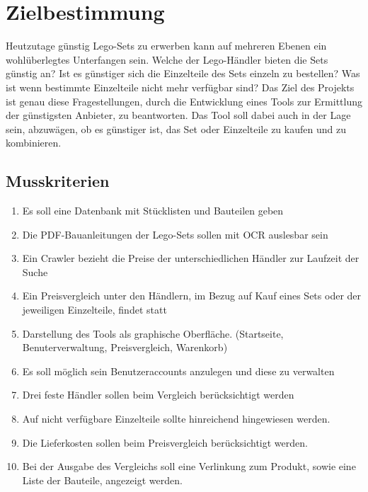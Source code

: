 \newpage

\tableofcontents

\newpage

\section{Zielbestimmung}

Heutzutage günstig Lego-Sets zu erwerben kann auf mehreren Ebenen ein wohlüberlegtes Unterfangen sein. Welche der Lego-Händler bieten die Sets günstig an? Ist es günstiger sich die Einzelteile des Sets einzeln zu bestellen? Was ist wenn bestimmte Einzelteile nicht mehr verfügbar sind? \newline
Das Ziel des Projekts ist genau diese Fragestellungen, durch die Entwicklung eines Tools zur Ermittlung der günstigsten Anbieter, zu beantworten. Das Tool soll dabei auch in der Lage sein, abzuwägen, ob es günstiger ist, das Set oder Einzelteile zu kaufen und zu kombinieren.

\subsection{Musskriterien}
\begin{enumerate}
\item Es soll eine Datenbank mit Stücklisten und Bauteilen geben
\item Die PDF-Bauanleitungen der Lego-Sets sollen mit OCR auslesbar sein
\item Ein Crawler bezieht die Preise der unterschiedlichen Händler zur Laufzeit der Suche
\item  Ein Preisvergleich unter den Händlern, im Bezug auf Kauf eines Sets oder der jeweiligen Einzelteile, findet statt
\item Darstellung des Tools als graphische Oberfläche. (Startseite, Benuterverwaltung, Preisvergleich, Warenkorb)
\item Es soll möglich sein Benutzeraccounts anzulegen und diese zu verwalten
\item Drei feste Händler sollen beim Vergleich berücksichtigt werden
\item Auf nicht verfügbare Einzelteile sollte hinreichend hingewiesen werden.
\item Die Lieferkosten sollen beim Preisvergleich berücksichtigt werden.
\item Bei der Ausgabe des Vergleichs soll eine Verlinkung zum Produkt, sowie eine Liste der Bauteile, angezeigt werden.
\end{enumerate}

